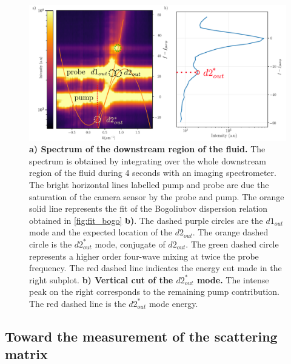 \begin{figure}
    \centering
    \includegraphics[width=1\textwidth]{chap_stimulated_hawking/fig/disp_supersonic_spectro.pdf}
    \caption{\textbf{a) Spectrum of the downstream region of the fluid.} The spectrum is obtained by integrating over the whole downstream region of the fluid during 4 seconds
    with an imaging spectrometer. The bright horizontal lines labelled pump and probe are due the saturation of the camera sensor by the probe and pump. The orange solid line represents the fit of the Bogoliubov dispersion relation obtained in \autoref{fig:fit_bogo} \textbf{b)}. The dashed purple circles are 
    the $d1_{out}$ mode and the expected location of the $d2_{out}$.
    The orange dashed circle is the $d2_{out}^*$ mode, conjugate of $d2_{out}$. The green dashed circle represents a higher order four-wave mixing at twice the probe frequency. The red dashed line indicates the energy cut made in the right subplot.
    \textbf{b) Vertical cut of the $d2_{out}^*$ mode.} The intense peak on the right corresponds to the remaining pump contribution. The red dashed line is the $d2_{out}^*$ mode energy.}
    \label{fig:spectrum_spectro}
\end{figure}
\bigskip

\subsection{Toward the measurement of the scattering matrix}
\label{sec:scattering_matrix_measurement}
